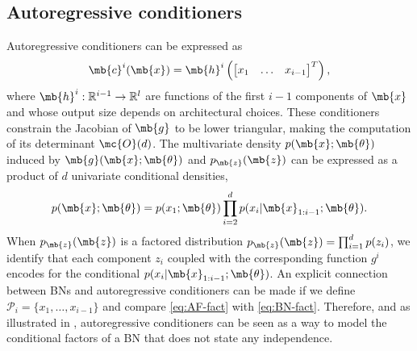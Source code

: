 \subsection{Autoregressive conditioners}
Autoregressive conditioners can be expressed as
$$\mb{c}^i(\mb{x}) = \mb{h}^i\left(\begin{bmatrix} x_1 & \hdots & x_{i-1} \end{bmatrix}^T\right),$$ where $\mb{h}^i: \mathbb{R}^{i-1} \rightarrow \mathbb{R}^l$ are functions of the first $i-1$ components of $\mb{x}$ and whose output size depends on architectural choices.
These conditioners constrain the Jacobian of $\mb{g}$ to be lower triangular, making the computation of its determinant $\mc{O}(d)$.
The multivariate density $p(\mb{x}; \mb{\theta})$ induced by $\mb{g}(\mb{x};\mb{\theta})$ and $p_{\mb{z}}(\mb{z})$ can be expressed as a product of $d$ univariate conditional densities,
\begin{align}
    p(\mb{x}; \mb{\theta}) = p(x_1; \mb{\theta})\prod^{d}_{i=2}p(x_{i}|\mb{x}_{1:i-1}; \mb{\theta}). \label{eq:AF-fact}
\end{align}
When $p_{\mb{z}}(\mb{z})$ is a factored distribution $p_{\mb{z}}(\mb{z}) = \prod^{d}_{i=1}p(z_i)$, we identify that each component $z_i$ coupled with the corresponding function $g^i$ encodes for the conditional $p(x_{i}|\mb{x}_{1:i-1}; \mb{\theta})$.
An explicit connection between BNs and autoregressive conditioners can be made if we define $\mathcal{P}_i = \{x_1, \hdots, x_{i-1}\}$ and compare \eqref{eq:AF-fact} with \eqref{eq:BN-fact}.  Therefore, and as illustrated in , autoregressive conditioners can be seen as a way to model the conditional factors of a BN that does not state any independence.
